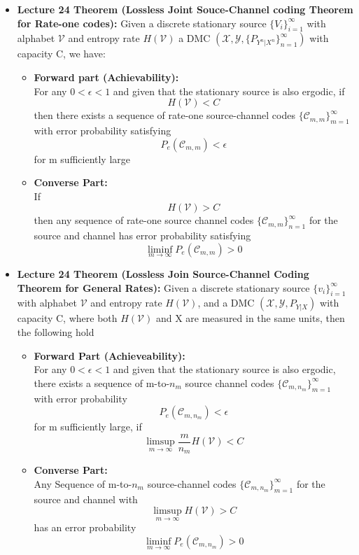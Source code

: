 \documentclass{article}
\begin{document}
\begin{itemize}
    \item \textbf{Lecture 24 Theorem (Lossless Joint Souce-Channel coding Theorem for Rate-one codes):}
    Given a discrete stationary source \(\{V_i\}_{i=1}^\infty\) with alphabet \(\mathcal{V}\) and entropy rate \(H(\mathcal{V})\) a DMC \((\mathcal{X}, \mathcal{Y}, \{P_{Y^n|X^n}\}_{n=1}^\infty)\) with capacity C, we have:
    \begin{itemize}
        \item \textbf{Forward part (Achievability):} \\
        For any \(0< \epsilon < 1\) and given that the stationary source is also ergodic, if
        \[H(\mathcal{V})<C\]
        then there exists a sequence of rate-one source-channel codes \(\{\mathcal{C}_{m,m}\}_{m=1}^\infty\) with error probability satisfying
        \[P_e(\mathcal{C}_{m,m})<\epsilon\]
        for m sufficiently large
        \item \textbf{Converse Part:} \\
        If 
        \[H(\mathcal{V})>C\]
        then any sequence of rate-one source channel codes \(\{\mathcal{C}_{m,m}\}_{n=1}^\infty\) for the source and channel has error probability satisfying
        \[\liminf_{m \to \infty} P_e(\mathcal{C}_{m,m})>0\]
    \end{itemize}

    \item \textbf{Lecture 24 Theorem (Lossless Join Source-Channel Coding Theorem for General Rates):} 
    Given a discrete stationary source \(\{v_i\}_{i=1}^\infty\) with alphabet \(\mathcal{V}\) and entropy rate \(H(\mathcal{V})\), and a DMC \((\mathcal{X}, \mathcal{Y}, P_{Y|X})\) with capacity C, where
    both \(H(\mathcal{V})\) and X are measured in the same units, then the following hold
    \begin{itemize}
        \item \textbf{Forward Part (Achieveability):} \\
        For any \(0<\epsilon<1\) and given that the stationary source is also ergodic, there exists a sequence of m-to-\(n_m\) source channel codes \(\{\mathcal{C}_{m, n_m}\}_{m=1}^\infty\) with error probability
        \[P_e(\mathcal{C}_{m,n_m})<\epsilon\]
        for m sufficiently large, if
        \[\limsup_{m \to \infty} \frac{m}{n_m}H(\mathcal{V})<C\]
        \item \textbf{Converse Part:} \\
        Any Sequence of m-to-\(n_m\) source-channel codes \(\{\mathcal{C}_{m, n_m}\}_{m=1}^\infty\) for the source and channel with
        \[\limsup_{m \to \infty}H(\mathcal{V})>C\]
        has an error probability
        \[\liminf_{m \to \infty} P_e(\mathcal{C}_{m,n_m})>0\]
    \end{itemize}
\end{itemize}
\end{document}
